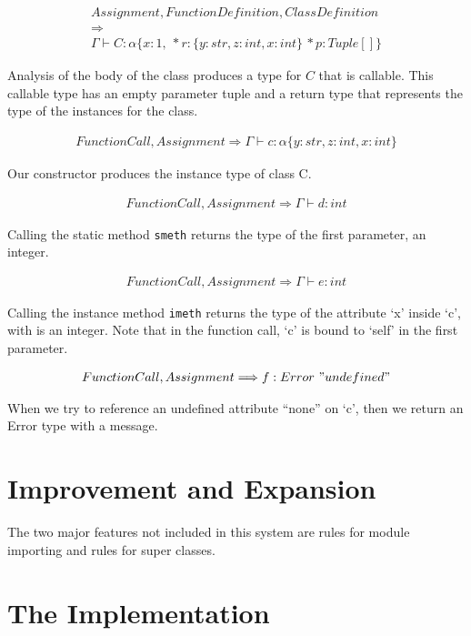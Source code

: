 \documentclass{article}
\begin{document}
\begin{align*}
Assignment,FunctionDefinition,ClassDefinition \\
\Longrightarrow\\
\Gamma \vdash C : \alpha\{x:1,\ *r:\{y:str, z:int, x:int\}\, *p:Tuple[]\}
\end{align*}

Analysis of the body of the class produces a type for $C$ that is callable.
This callable type has an empty parameter tuple and a return type that
represents the type of the instances for the class.

\begin{align*}
FunctionCall, Assignment \Longrightarrow \Gamma \vdash c : \alpha\{y:str, z:int, x:int\}
\end{align*}

Our constructor produces the instance type of class C. 

\begin{align*}
FunctionCall, Assignment \Longrightarrow \Gamma \vdash d : int
\end{align*}

Calling the static method \texttt{smeth} returns the type of the first parameter, an integer.

\begin{align*}
FunctionCall, Assignment \Longrightarrow \Gamma \vdash  e : int
\end{align*}

Calling the instance method \texttt{imeth} returns the type of the attribute `x' inside `c', with is an integer. Note that in the function call, `c' is bound to `self' in the first parameter.

\begin{align*}
FunctionCall, Assignment \Longrightarrow f : Error\ "undefined"
\end{align*}

When we try to reference an undefined attribute ``none'' on `c', then we return an Error type with a message.

\section*{Improvement and Expansion}

The two major features not included in this system are rules for module
importing and rules for super classes.


\section*{The Implementation}
\end{document}
